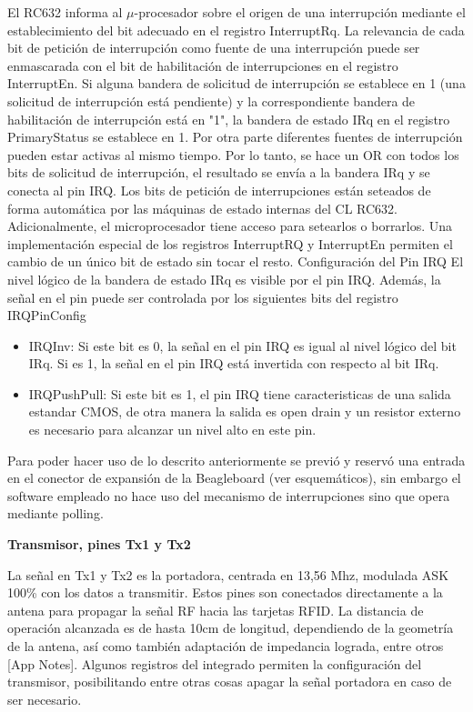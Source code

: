 El RC632 informa al $\mu$-procesador sobre el origen de una interrupción mediante el establecimiento del bit adecuado en el registro InterruptRq. La relevancia de cada bit de petición de interrupción como fuente de una interrupción puede ser enmascarada con el bit de habilitación de interrupciones en el registro InterruptEn. 
Si alguna bandera de solicitud de interrupción se establece en 1 (una solicitud de interrupción está pendiente) y la correspondiente bandera de habilitación de interrupción está en "1", la bandera de estado IRq en el registro PrimaryStatus se establece en 1. 
Por otra parte diferentes fuentes de interrupción pueden estar activas al mismo tiempo. Por lo tanto, se hace un OR con todos los bits de solicitud de interrupción, el resultado se envía a la bandera IRq y se conecta al pin IRQ. 
Los bits de petición de interrupciones están seteados de forma automática por las máquinas de estado internas del CL RC632. Adicionalmente, el microprocesador tiene acceso para setearlos o borrarlos. 
Una implementación especial de los registros InterruptRQ y InterruptEn permiten el cambio de un único bit de estado sin tocar el resto. 
Configuración del Pin IRQ 
El nivel lógico de la bandera de estado IRq es visible por el pin IRQ. Además, la señal en el pin puede ser controlada por los siguientes bits del registro IRQPinConfig 
\begin{itemize}
\item IRQInv: 	   Si este bit es 0, la señal en el pin IRQ es igual al nivel lógico del bit IRq. 
		  	   Si es 1, la señal en el pin IRQ está invertida con respecto al bit IRq. 
\item IRQPushPull:  Si este bit es 1, el pin IRQ tiene caracteristicas de una salida estandar 				   CMOS, de otra manera la salida es open drain y un resistor externo es 				   necesario para alcanzar un nivel alto en este pin. 
\end{itemize}

Para poder hacer uso de lo descrito anteriormente se previó y reservó una entrada en el conector de expansión de la Beagleboard (ver esquemáticos), sin embargo el software empleado no hace uso del mecanismo de interrupciones sino que opera mediante polling.

\bigskip
{\bf{Transmisor, pines Tx1 y Tx2}}

La señal en Tx1 y Tx2 es la portadora, centrada en 13,56 Mhz, modulada ASK 100\% con los datos a transmitir. Estos pines son conectados directamente a la antena para propagar la señal RF hacia las tarjetas RFID. La distancia de operación alcanzada es de hasta 10cm de longitud, dependiendo de la geometría de la antena, así como también adaptación de impedancia lograda, entre otros [App Notes].
Algunos registros del integrado permiten la configuración del transmisor, posibilitando entre otras cosas apagar la señal portadora en caso de ser necesario.

